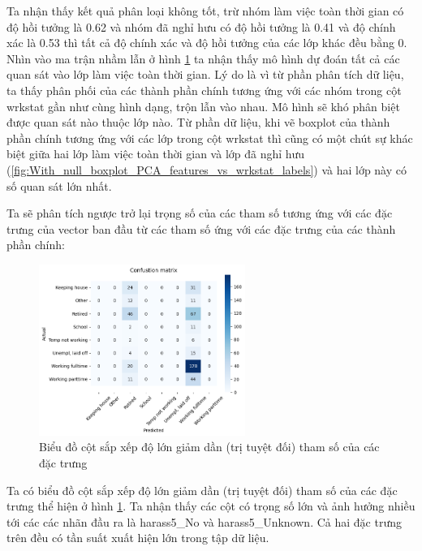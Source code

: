 \begin{enumerate}[label=(\alph*)]
    Ta nhận thấy kết quả phân loại không tốt, trừ nhóm làm việc toàn thời gian có độ hồi tưởng là 0.62 và nhóm đã nghỉ hưu có độ hồi tưởng là 0.41 và độ chính xác là 0.53 thì tất cả độ chính xác và độ hồi tưởng của các lớp khác đều bằng 0.
    Nhìn vào ma trận nhầm lẫn ở hình \ref{fig:With_null_models_confusion_matrix_Random_Forest_PCA_features} ta nhận thấy mô hình dự đoán tất cả các quan sát vào lớp làm việc toàn thời gian.
    Lý do là vì từ phần phân tích dữ liệu, ta thấy phân phối của các thành phần chính tương ứng với các nhóm trong cột wrkstat gần như cùng hình dạng, trộn lẫn vào nhau.
    Mô hình sẽ khó phân biệt được quan sát nào thuộc lớp nào.
    Từ phần dữ liệu, khi vẽ boxplot của thành phần chính tương ứng với các lớp trong cột wrkstat thì cũng có một chút sự khác biệt giữa hai lớp làm việc toàn thời gian và lớp đã nghỉ hưu (\ref{fig:With_null_boxplot_PCA_features_vs_wrkstat_labels}) và hai lớp này có số quan sát lớn nhất.

    Ta sẽ phân tích ngược trở lại trọng số của các tham số tương ứng với các đặc trưng của vector ban đầu từ các tham số ứng với các đặc trưng của các thành phần chính:

    \begin{figure}[H]
        \centering
        \includegraphics[width=0.6\textwidth]{figures/Thanh/Models/Random_Forest/With_null_models_confusion_matrix_Random_Forest_PCA_features.png}
        \caption{Biểu đồ cột sắp xếp độ lớn giảm dần (trị tuyệt đối) tham số của các đặc trưng}
        \label{fig:With_null_models_confusion_matrix_Random_Forest_PCA_features}
    \end{figure}

    Ta có biểu đồ cột sắp xếp độ lớn giảm dần (trị tuyệt đối) tham số của các đặc trưng thể hiện ở hình \ref{fig:With_null_models_confusion_matrix_Random_Forest_PCA_features}.
    Ta nhận thấy các cột có trọng số lớn và ảnh hưởng nhiều tới các các nhãn đầu ra là harass5\_No và harass5\_Unknown.
    Cả hai đặc trưng trên đều có tần suất xuất hiện lớn trong tập dữ liệu.


\end{enumerate}
